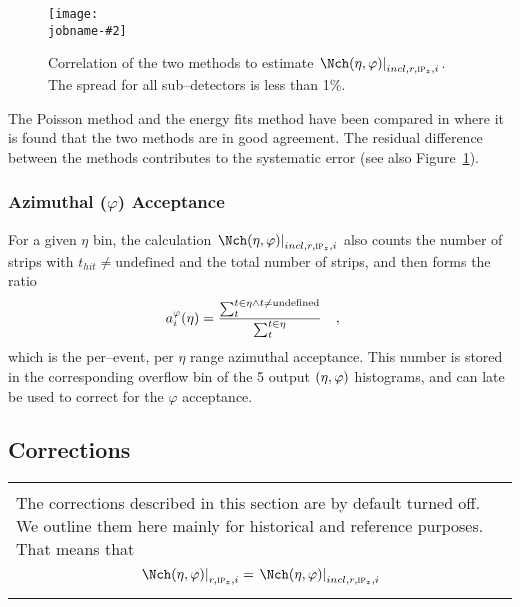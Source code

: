 \documentclass[compat,11pt]{alicenote}
\newcommand*{\etaphi}{\ensuremath(\eta,\varphi)}
\newcommand{\figref}[1]{Figure~\ref{#1}}
\newcommand{\dndetadphi}[1][]{{\ensuremath%
    \ifx|#1|\else\left.\fi%
      \Nch\etaphi%
      \ifx|#1|\else\right|_{#1}\fi}}
\newcommand{\phiAcc}{\ensuremath a_i^{\varphi}(\eta)}
\newcommand\figinput[2][\textwidth]{%
  \texttt{[image: \\jobname-\#2]}}
\begin{document}
\begin{figure}[htbp]
  \centering
  \figinput[.8\linewidth]{corr_method}
  \caption{Correlation of the two methods to estimate
    $\dndetadphi[incl,r,\subIPz,i]$.  The spread for all sub--detectors is
    less than 1\%.}
  \label{fig:density:corr}
\end{figure}


The Poisson method and the energy fits method have been compared in
\cite{hhd:2009} where it is found that the two methods are in good
agreement. The residual difference between the methods contributes to
the systematic error (see also \figref{fig:density:corr}).

\subsubsection{Azimuthal ($\varphi$) Acceptance} 

For a given $\eta$ bin, the calculation
$\dndetadphi[incl,r,\subIPz,i]$ also counts the number of strips with
$t_{hit}\neq\text{undefined}$ and the total number of strips, and then
forms the ratio
\begin{align}
  \label{eq:overflow}
  \phiAcc &= \frac{\sum_t^{t\in\eta \wedge
      t\neq\text{undefined}}}{\sum_t^{t\in\eta}} \quad,
\end{align}
which is the per--event, per $\eta$ range azimuthal acceptance.  This
number is stored in the corresponding overflow bin of the 5 output
$\etaphi$ histograms, and can late be used to correct for the
$\varphi$ acceptance.

\subsection{Corrections}
\label{sec:sub:corrector}

\begin{center}
  \begin{tabular}{|p{.9\linewidth}|}
    \arrayrulecolor{alicepurple}
    \hline
    \cellcolor{alicered!20}\\
    \cellcolor{alicered!20}
    The corrections described in this section are by default turned off.
    We outline them here mainly for historical and reference
    purposes. That means that 
    \begin{equation}
      \dndetadphi[r,\subIPz,i] = \dndetadphi[incl,r,\subIPz,i]
    \end{equation}\\
    \hline
  \end{tabular}
\end{center}
\end{document}
